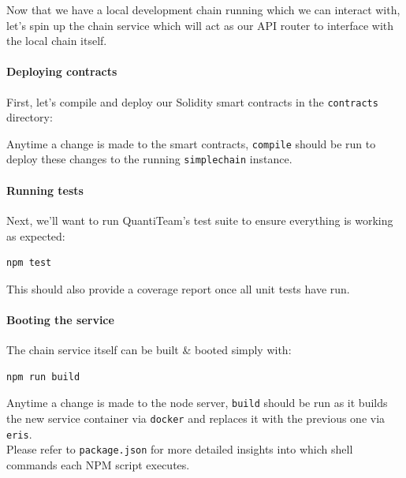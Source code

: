 \documentclass[12pt]{report}
\newenvironment{Shaded}{}{}
\newcommand{\KeywordTok}[1]{\textcolor[rgb]{0.00,0.44,0.13}{\textbf{{#1}}}}
\newcommand{\CommentTok}[1]{\textcolor[rgb]{0.38,0.63,0.69}{\textit{{#1}}}}
\newcommand{\OtherTok}[1]{\textcolor[rgb]{0.00,0.44,0.13}{{#1}}}
\newcommand{\NormalTok}[1]{{#1}}
\let\oldparagraph\paragraph
\renewcommand{\paragraph}[1]{\oldparagraph{#1}\mbox{}}
\begin{document}
Now that we have a local development chain running which we can interact
with, let's spin up the chain service which will act as our API router
to interface with the local chain itself.

\paragraph{Deploying contracts}\label{deploying-contracts}

First, let's compile and deploy our Solidity smart contracts in the
\texttt{contracts} directory:

\begin{Shaded}
\end{Shaded}

Anytime a change is made to the smart contracts, \texttt{compile} should
be run to deploy these changes to the running \texttt{simplechain}
instance.

\paragraph{Running tests}\label{running-tests}

Next, we'll want to run QuantiTeam's test suite to ensure everything is
working as expected:

\begin{verbatim}
npm test
\end{verbatim}

This should also provide a coverage report once all unit tests have run.

\paragraph{Booting the service}\label{booting-the-service}

The chain service itself can be built \& booted simply with:

\begin{verbatim}
npm run build
\end{verbatim}

Anytime a change is made to the node server, \texttt{build} should be
run as it builds the new service container via \texttt{docker} and
replaces it with the previous one via \texttt{eris}.\\
Please refer to \texttt{package.json} for more detailed insights into
which shell commands each NPM script executes.
\end{document}
